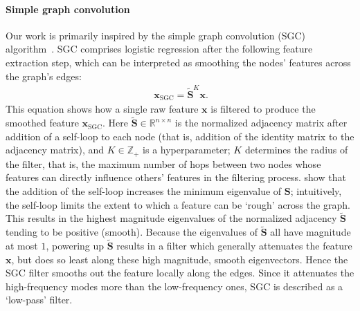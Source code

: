 \documentclass{article}
\newcommand{\Cam}[1]{\textcolor{blue}{Cam: #1}}
\begin{document}
\paragraph{Simple graph convolution} Our work is primarily inspired by the simple graph convolution (SGC) algorithm~\citep{wu2019simplifying}.
SGC comprises logistic regression after the following feature extraction step, which can be interpreted as smoothing the nodes' features across the graph's edges:
%
\begin{align}~\label{eqn:sgc}
    \bm{x}_{\text{SGC}} = \tilde{\bm{S}}^K \bm{x}.
\end{align}
%
This equation shows how a single raw feature $\mathbf{x}$ is filtered to produce the smoothed feature $\bm{x}_{\text{SGC}}$. Here $\tilde{\bm{S}} \in \mathbb{R}^{n\times n}$ is the normalized adjacency matrix after addition of a self-loop to each node (that is, addition of the identity matrix to the adjacency matrix), and $K\in \mathbb{Z}_+$ is a hyperparameter; $K$ determines the radius of the filter, that is, the maximum number of hops between two nodes whose features can directly influence others' features in the filtering process.
\citet{wu2019simplifying} show that the addition of the self-loop increases the minimum eigenvalue of $\bm{S}$; intuitively, the self-loop limits the extent to which a feature can be `rough' across the graph.
This results in the highest magnitude eigenvalues of the normalized adjacency $\tilde{\bm{S}}$ tending to be positive (smooth). Because the eigenvalues of $\tilde{\bm{S}}$ all have magnitude at most $1$, powering up $\tilde{\bm{S}}$ results in a filter which generally attenuates the feature $\bm{x}$, but does so least along these high magnitude, smooth eigenvectors. Hence the SGC filter smooths out the feature locally along the edges. Since it attenuates the high-frequency modes more than the low-frequency ones, SGC is described as a `low-pass' filter.

\end{document}
